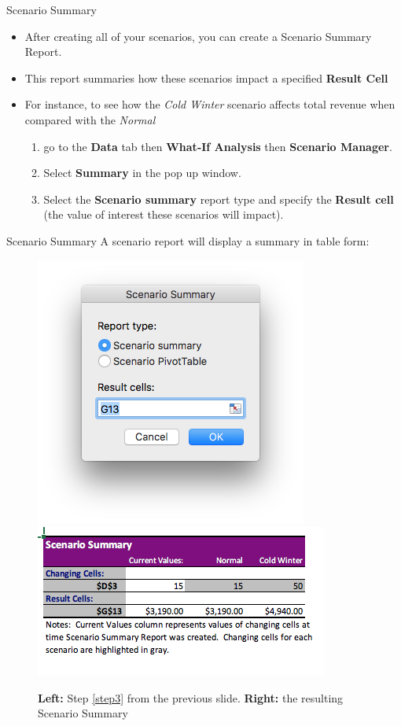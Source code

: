 \documentclass[xcolor=svgnames]{beamer}
\begin{document}
\begin{frame}{Scenario Summary}
\begin{itemize}
\item After creating all of your scenarios, you can create a Scenario Summary Report.
\medskip
\item This report summaries how these scenarios impact a specified {\bf Result Cell}
\medskip
\item For instance, to see how the \textit{Cold Winter} scenario affects total revenue when compared with the \textit{Normal}
\begin{enumerate}
\item go to the {\bf Data} tab then {\bf What-If Analysis} then {\bf Scenario Manager}.  
\item Select {\bf Summary} in the pop up window. 
\item  Select the {\bf Scenario summary} report type and specify the {\bf Result cell} (the value of interest these scenarios will impact). \label{step3}
\end{enumerate}
\end{itemize}
\end{frame}


\begin{frame}{Scenario Summary}
A scenario report will display a summary in table form:
\begin{figure}[htbp]
\begin{center}
\includegraphics[height=0.4\textwidth]{scwin}
\includegraphics[height=0.3\textwidth]{scsum}
\caption{{\bf Left:} Step \ref{step3} from the previous slide. {\bf Right:} the resulting Scenario Summary  }
\label{default}
\end{center}
\end{figure}

\end{frame}
\end{document}
